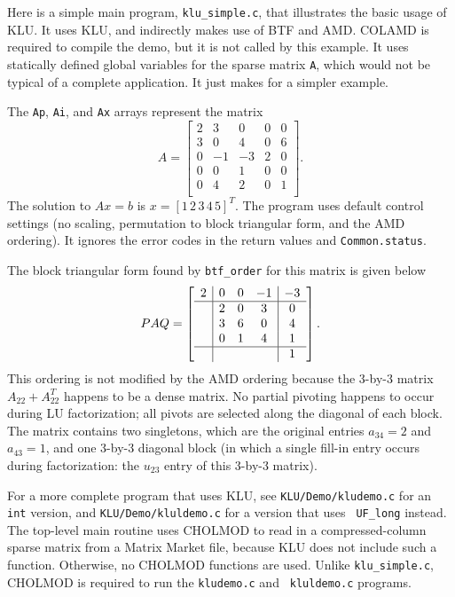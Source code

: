 \documentclass[11pt]{article}
\begin{document}
Here is a simple main program, {\tt klu\_simple.c}, that illustrates the basic
usage of KLU.  It uses KLU, and indirectly makes use of BTF and AMD.  COLAMD is
required to compile the demo, but it is not called by this example.  It uses
statically defined global variables for the sparse matrix {\tt A}, which would
not be typical of a complete application.  It just makes for a simpler example.

{\footnotesize

}

The {\tt Ap}, {\tt Ai}, and {\tt Ax} arrays represent the matrix
\[
A = \left[
\begin{array}{ccccc}
 2 &  3 &  0 &  0 &  0 \\
 3 &  0 &  4 &  0 &  6 \\
 0 & -1 & -3 &  2 &  0 \\
 0 &  0 &  1 &  0 &  0 \\
 0 &  4 &  2 &  0 &  1 \\
\end{array}
\right].
\]
The solution to $Ax=b$ is $x = [1 \, 2 \, 3 \, 4 \, 5]^T$.  The program
uses default control settings (no scaling, permutation to block triangular
form, and the AMD ordering).  It ignores the error codes in the return values
and {\tt Common.status}.

The block triangular form found by {\tt btf\_order} for this matrix is
given below
\[
PAQ = \left[
\begin{array}{c|ccc|c}
2 & 0 & 0 & -1 & -3 \\
\hline
  & 2 & 0 & 3 & 0 \\
  & 3 & 6 & 0 & 4 \\
  & 0 & 1 & 4 & 1 \\
\hline
  &   &   &   & 1 \\
\end{array}
\right].
\]
This ordering is not modified by the AMD ordering because the 3-by-3 matrix
$A_{22} + A_{22}^T$ happens to be a dense matrix.  No partial pivoting happens
to occur during LU factorization; all pivots are selected along the diagonal of
each block.  The matrix contains two singletons, which are the original entries
$a_{34}=2$ and $a_{43}=1$, and one 3-by-3 diagonal block (in which a single
fill-in entry occurs during factorization: the $u_{23}$ entry of this 3-by-3
matrix).

For a more complete program that uses KLU, see {\tt KLU/Demo/kludemo.c} for an
{\tt int} version, and {\tt KLU/Demo/kluldemo.c} for a version that uses {\tt
UF\_long} instead.  The top-level main routine uses CHOLMOD to read in a
compressed-column sparse matrix from a Matrix Market file, because KLU does not
include such a function.  Otherwise, no CHOLMOD functions are used.  Unlike
{\tt klu\_simple.c}, CHOLMOD is required to run the {\tt kludemo.c} and {\tt
kluldemo.c} programs.
\end{document}
